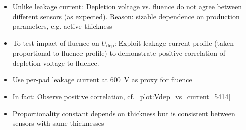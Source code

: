 \begin{itemize}
	\item Unlike leakage current: Depletion voltage vs. fluence do not agree between different sensors (as expected). Reason: sizable dependence on production parameters, e.g. active thickness
	\item To test impact of fluence on $U_\text{dep}$: Exploit leakage current profile (taken proportional to fluence profile) to demonstrate positive correlation of depletion voltage to fluence.
	\item Use per-pad leakage current at \SI{600}{\volt} as proxy for fluence
	\item In fact: Observe positive correlation, cf.~\ref{plot:Vdep_vs_current_5414}
	\item Proportionality constant depends on thickness but is consistent between sensors with same thicknesses
\end{itemize}